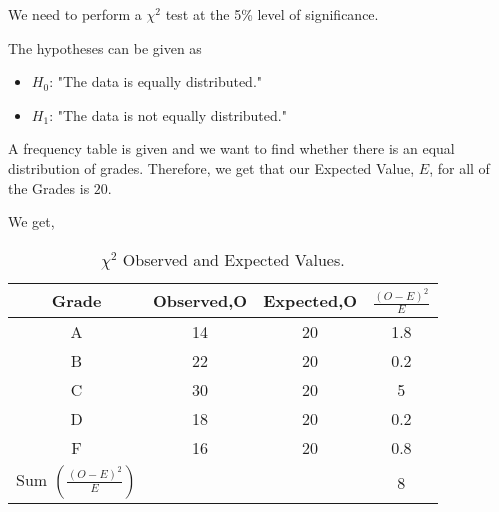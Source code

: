 %
%


\begin{subquestions}
	
\subquestion

We need to perform a $\chi^2$ test at the 5\% level of significance.

\begin{subsubquestions}
	
\subsubquestion

The hypotheses can be given as
\begin{itemize}
	\item $H_0$: "The data is equally distributed."
	
	\item $H_1$: "The data is not equally distributed."
\end{itemize}


\subsubquestion

A frequency table is given and we want to find whether there is an equal distribution of grades. Therefore, we get that our Expected Value, $E$, for all of the Grades is $20$.

We get,
\begin{table}[H]
	\centering
	\begin{tabular}{|c|c|c|c|}
		\hline
		Grade & Observed,O & Expected,O & $\frac{(O-E)^2}{E}$ \\
		\hline
		A & 14 & 20 & 1.8 \\
		B & 22 & 20 & 0.2 \\
		C & 30 & 20 & 5 \\ 
		D & 18 & 20 & 0.2 \\ 
		F & 16 & 20 & 0.8 \\
		\hline
		Sum $\left( \frac{(O-E)^2}{E} \right) $ & & & 8 \\
		\hline
	\end{tabular}
	\caption{\label{2016:q4:ChiTable} $\chi^2$ Observed and Expected Values.}
\end{table}
	

\end{subsubquestions}
\end{subquestions}
